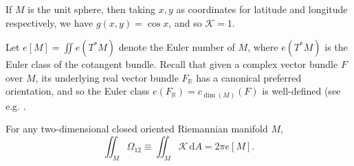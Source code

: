 \documentclass[a4paper,openany]{scrbook}
\newcommand{\ud}{\mathrm{d}}
\begin{document}
\begin{example}\label{gcsphere}
If $M$ is the unit sphere, then taking $x,y$ as coordinates for latitude and longitude respectively, we have $g(x,y)=\cos x$, and so $\mathcal{K}=1$.
\end{example}

Let $e[M]=\iint e(T^*M)$ denote the Euler number of $M$, where $e(T^*M)$ is the Euler class of the cotangent bundle. Recall that given a complex vector bundle $F$ over $M$, its underlying real vector bundle $F_\mathbb{R}$ has a canonical preferred orientation, and so the Euler class $e(F_\mathbb{R})=c_{\dim(M)}(F)$ is well-defined (see e.g. \cite[Lemma 14.1]{milnor-stasheff}.

\begin{thm}
For any two-dimensional closed oriented Riemannian manifold $M$,
\begin{equation}
\iint_M\Omega_{12}\equiv\iint_M\mathcal{K}\,\ud A=2\pi e[M].
\end{equation}
\end{thm}
\end{document}
